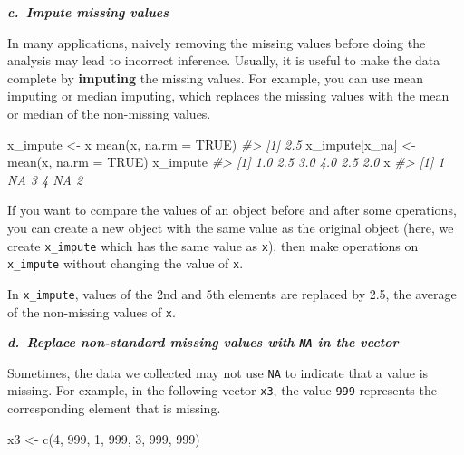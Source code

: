 \documentclass[
]{book}
\newenvironment{Shaded}{\begin{snugshade}}{\end{snugshade}}
\newcommand{\AttributeTok}[1]{\textcolor[rgb]{0.77,0.63,0.00}{#1}}
\newcommand{\CommentTok}[1]{\textcolor[rgb]{0.56,0.35,0.01}{\textit{#1}}}
\newcommand{\ConstantTok}[1]{\textcolor[rgb]{0.00,0.00,0.00}{#1}}
\newcommand{\DecValTok}[1]{\textcolor[rgb]{0.00,0.00,0.81}{#1}}
\newcommand{\FunctionTok}[1]{\textcolor[rgb]{0.00,0.00,0.00}{#1}}
\newcommand{\NormalTok}[1]{#1}
\newcommand{\OtherTok}[1]{\textcolor[rgb]{0.56,0.35,0.01}{#1}}
\newenvironment{blackbox}{
  \definecolor{shadecolor}{rgb}{0, 0, 0}  %
  \color{white}
  \begin{shaded}}
 {\end{shaded}}
\newenvironment{infobox}[1]
  {
  \begin{itemize}
  \renewcommand{\labelitemi}{
    \raisebox{-.7\height}[0pt][0pt]{
      {\setkeys{Gin}{width=3em,keepaspectratio}
        \texttt{[image: pics/\#1]}}
    }
  }
  \setlength{\fboxsep}{1em}
  \begin{blackbox}
  \item
  }
  {
  \end{blackbox}
  \end{itemize}
  }
\begin{document}
\textbf{\emph{c.~Impute missing values}}

In many applications, naively removing the missing values before doing the analysis may lead to incorrect inference. Usually, it is useful to make the data complete by \textbf{imputing} the missing values. For example, you can use mean imputing or median imputing, which replaces the missing values with the mean or median of the non-missing values.

\begin{Shaded}
\begin{Highlighting}[]
\NormalTok{x\_impute }\OtherTok{\textless{}{-}}\NormalTok{ x}
\FunctionTok{mean}\NormalTok{(x, }\AttributeTok{na.rm =} \ConstantTok{TRUE}\NormalTok{)}
\CommentTok{\#\textgreater{} [1] 2.5}
\NormalTok{x\_impute[x\_na] }\OtherTok{\textless{}{-}} \FunctionTok{mean}\NormalTok{(x, }\AttributeTok{na.rm =} \ConstantTok{TRUE}\NormalTok{)}
\NormalTok{x\_impute}
\CommentTok{\#\textgreater{} [1] 1.0 2.5 3.0 4.0 2.5 2.0}
\NormalTok{x}
\CommentTok{\#\textgreater{} [1]  1 NA  3  4 NA  2}
\end{Highlighting}
\end{Shaded}

\begin{infobox}{caution}
If you want to compare the values of an object before and after some operations, you can create a new object with the same value as the original object (here, we create \texttt{x\_impute} which has the same value as \texttt{x}), then make operations on \texttt{x\_impute} without changing the value of \texttt{x}.

\end{infobox}

In \texttt{x\_impute}, values of the 2nd and 5th elements are replaced by 2.5, the average of the non-missing values of \texttt{x}.

\textbf{\emph{d.~Replace non-standard missing values with \texttt{NA} in the vector}}

Sometimes, the data we collected may not use \texttt{NA} to indicate that a value is missing. For example, in the following vector \texttt{x3}, the value \texttt{999} represents the corresponding element that is missing.

\begin{Shaded}
\begin{Highlighting}[]
\NormalTok{x3 }\OtherTok{\textless{}{-}} \FunctionTok{c}\NormalTok{(}\DecValTok{4}\NormalTok{, }\DecValTok{999}\NormalTok{, }\DecValTok{1}\NormalTok{, }\DecValTok{999}\NormalTok{, }\DecValTok{3}\NormalTok{, }\DecValTok{999}\NormalTok{, }\DecValTok{999}\NormalTok{)}
\end{Highlighting}
\end{Shaded}
\end{document}

